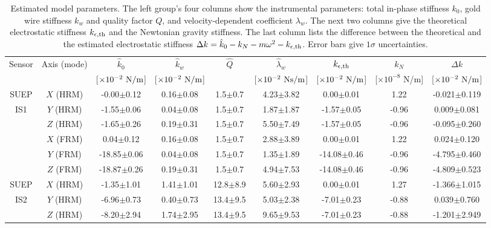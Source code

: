\begin{table}%
\caption{Estimated model parameters. The left group's four columns show the instrumental parameters: total in-phase stiffness $k_0$, gold wire stiffness $k_w$ and quality factor $Q$, and velocity-dependent coefficient $\lambda_w$. The next two columns give the theoretical electrostatic stiffness $k_{\epsilon, {\rm th}}$ and the Newtonian gravity stiffness. The last column lists the difference between the theoretical and the estimated electrostatic stiffness $\Delta k = \hat{k}_0 - k_N - m \omega^2 - k_{\epsilon, {\rm th}}$. Error bars give $1\sigma$ uncertainties.
} 
\small
\begin{center}
\begin{tabular}{cc|cccc||cc||c}
\hline
Sensor & Axis (mode) & $\hat{k}_0$ & $\hat{k}_w$ & $\hat{Q}$ & $\hat{\lambda}_w$ & $k_{\epsilon, {\rm th}}$ & $k_N$ & $\Delta k$ \\
 & &  [$\times10^{-2}~{\rm N/m}$] &  [$\times10^{-2}~{\rm N/m}$] & &  [$\times10^{-2}~{\rm Ns/m}$] &  [$\times10^{-2}~{\rm N/m}$] & [$\times 10^{-8}$ N/m] &  [$\times10^{-2}~{\rm N/m}$] \\
\hline
SUEP & $X$ (HRM) & -0.00$\pm$0.12& 0.16$\pm$0.08 & 1.5$\pm$0.7 & 4.23$\pm$3.82 & 0.00$\pm$0.01 & 1.22 & -0.021$\pm$0.119 \\
IS1 & $Y$ (HRM) & -1.55$\pm$0.06& 0.04$\pm$0.08 & 1.5$\pm$0.7 & 1.87$\pm$1.87 & -1.57$\pm$0.05 & -0.96 & 0.009$\pm$0.081 \\
 & $Z$ (HRM) & -1.65$\pm$0.26& 0.19$\pm$0.31 & 1.5$\pm$0.7 & 5.50$\pm$7.49 & -1.57$\pm$0.05 & -0.96 & -0.095$\pm$0.260 \\
 & $X$ (FRM) & 0.04$\pm$0.12& 0.16$\pm$0.08 & 1.5$\pm$0.7 & 2.88$\pm$3.89 & 0.00$\pm$0.01 & 1.22 & 0.024$\pm$0.120 \\
 & $Y$ (FRM) & -18.85$\pm$0.06& 0.04$\pm$0.08 & 1.5$\pm$0.7 & 1.35$\pm$1.89 & -14.08$\pm$0.46 & -0.96 & -4.795$\pm$0.460 \\
 & $Z$ (FRM) & -18.87$\pm$0.26& 0.19$\pm$0.31 & 1.5$\pm$0.7 & 4.94$\pm$7.53 & -14.08$\pm$0.46 & -0.96 & -4.809$\pm$0.523 \\
\hline
SUEP & $X$ (HRM) & -1.35$\pm$1.01& 1.41$\pm$1.01 & 12.8$\pm$8.9 & 5.60$\pm$2.93 & 0.00$\pm$0.01 & 1.27 & -1.366$\pm$1.015 \\
IS2 & $Y$ (HRM) & -6.96$\pm$0.73& 0.40$\pm$0.73 & 13.4$\pm$9.5 & 5.03$\pm$2.38 & -7.01$\pm$0.23 & -0.88 & 0.039$\pm$0.760 \\
 & $Z$ (HRM) & -8.20$\pm$2.94& 1.74$\pm$2.95 & 13.4$\pm$9.5 & 9.65$\pm$9.53 & -7.01$\pm$0.23 & -0.88 & -1.201$\pm$2.949 \\

\end{tabular}
\end{center}
\end{table}
